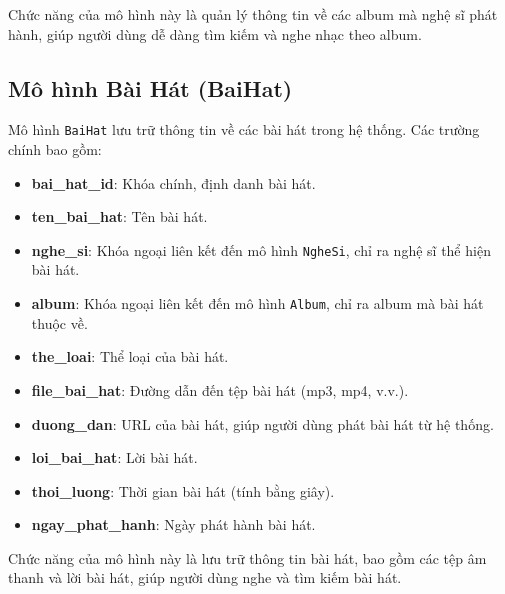 Chức năng của mô hình này là quản lý thông tin về các album mà nghệ sĩ phát hành, giúp người dùng dễ dàng tìm kiếm và nghe nhạc theo album.

\subsection{Mô hình Bài Hát (BaiHat)}
Mô hình \texttt{BaiHat} lưu trữ thông tin về các bài hát trong hệ thống. Các trường chính bao gồm:
\begin{itemize}
    \item \textbf{bai\_hat\_id}: Khóa chính, định danh bài hát.
    \item \textbf{ten\_bai\_hat}: Tên bài hát.
    \item \textbf{nghe\_si}: Khóa ngoại liên kết đến mô hình \texttt{NgheSi}, chỉ ra nghệ sĩ thể hiện bài hát.
    \item \textbf{album}: Khóa ngoại liên kết đến mô hình \texttt{Album}, chỉ ra album mà bài hát thuộc về.
    \item \textbf{the\_loai}: Thể loại của bài hát.
    \item \textbf{file\_bai\_hat}: Đường dẫn đến tệp bài hát (mp3, mp4, v.v.).
    \item \textbf{duong\_dan}: URL của bài hát, giúp người dùng phát bài hát từ hệ thống.
    \item \textbf{loi\_bai\_hat}: Lời bài hát.
    \item \textbf{thoi\_luong}: Thời gian bài hát (tính bằng giây).
    \item \textbf{ngay\_phat\_hanh}: Ngày phát hành bài hát.
\end{itemize}

Chức năng của mô hình này là lưu trữ thông tin bài hát, bao gồm các tệp âm thanh và lời bài hát, giúp người dùng nghe và tìm kiếm bài hát.

